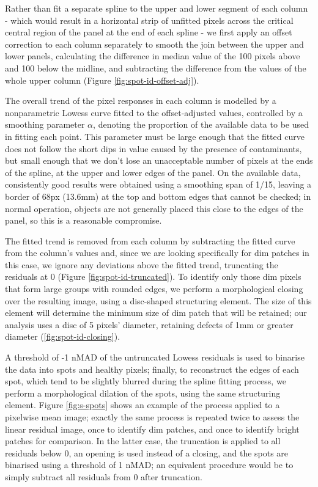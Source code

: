 \documentclass[\main/IO-Pixels.tex]{subfiles}
\begin{document}
Rather than fit a separate spline to the upper and lower segment of each column - which would result in a horizontal strip of unfitted pixels across the critical central region of the panel at the end of each spline - we first apply an offset correction to each column separately to smooth the join between the upper and lower panels, calculating the difference in median value of the 100 pixels above and 100 below the midline, and subtracting the difference from the values of the whole upper column (Figure \ref{fig:spot-id-offset-adj}). 

The overall trend of the pixel responses in each column is modelled by a nonparametric Lowess curve fitted to the offset-adjusted values, controlled by a smoothing parameter $\alpha$, denoting the proportion of the available data to be used in fitting each point. This parameter must be large enough that the fitted curve does not follow the short dips in value caused by the presence of contaminants, but small enough that we don't lose an unacceptable number of pixels at the ends of the spline, at the upper and lower edges of the panel. On the available data, consistently good results were obtained using a smoothing span of 1/15, leaving a border of 68px (13.6mm) at the top and bottom edges that cannot be checked; in normal operation, objects are not generally placed this close to the edges of the panel, so this is a reasonable compromise. 

The fitted trend is removed from each column by subtracting the fitted curve from the column's values and, since we are looking specifically for dim patches in this case, we ignore any deviations above the fitted trend, truncating the residuals at 0 (Figure \ref{fig:spot-id-truncated}). To identify only those dim pixels that form large groups with rounded edges, we perform a morphological closing \cite{Vincent1997} over the resulting image, using a disc-shaped structuring element. The size of this element will determine the minimum size of dim patch that will be retained; our analysis uses a disc of 5 pixels' diameter, retaining defects of 1mm or greater diameter (\ref{fig:spot-id-closing}).

A threshold of -1 nMAD of the untruncated Lowess residuals is used to binarise the data into spots and healthy pixels; finally, to reconstruct the edges of each spot, which tend to be slightly blurred during the spline fitting process, we perform a morphological dilation of the spots, using the same structuring element. Figure \ref{fig:s-spots} shows an example of the process applied to a pixelwise mean image; exactly the same process is repeated twice to assess the linear residual image, once to identify dim patches, and once to identify bright patches for comparison. In the latter case, the truncation is applied to all residuals below 0, an opening is used instead of a closing, and the spots are binarised using a threshold of 1 nMAD; an equivalent procedure would be to simply subtract all residuals from 0 after truncation.
\end{document}
